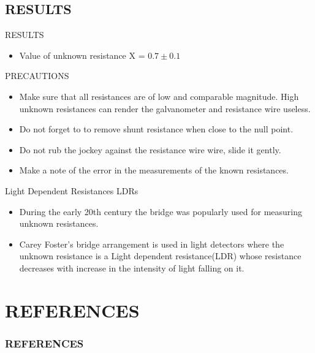 \documentclass[aspectratio=169]{beamer}
\begin{document}
	\subsection{RESULTS}
	\begin{frame}{RESULTS}
		\begin{itemize}
			\item Value of unknown resistance X = $0.7 \pm 0.1$
		\end{itemize}
	\end{frame}
	\begin{frame}{PRECAUTIONS}
		\begin{itemize}
			\item Make sure that all resistances are of low and comparable magnitude. High unknown resistances can render the galvanometer and resistance wire useless.
			\item Do not forget to to remove shunt resistance when close to the null point.
			\item Do not rub the jockey against the resistance wire wire, slide it gently. 
			\item Make a note of the error in the measurements of the known resistances.
		\end{itemize}
	\end{frame}
	\begin{frame}{Light Dependent Resistances LDRs}
		\begin{itemize}
			\item During the early 20th century the bridge was popularly used for measuring unknown resistances.
			\item Carey Foster's bridge arrangement is used in light detectors where the unknown resistance is a Light dependent resistance(LDR) whose resistance decreases with increase in the intensity of light falling on it.
		\end{itemize}
	\end{frame}
\section{REFERENCES}
	\begin{frame}[t]
	\frametitle{REFERENCES}
		\printbibliography[heading=none]
	\end{frame}
\end{document}
